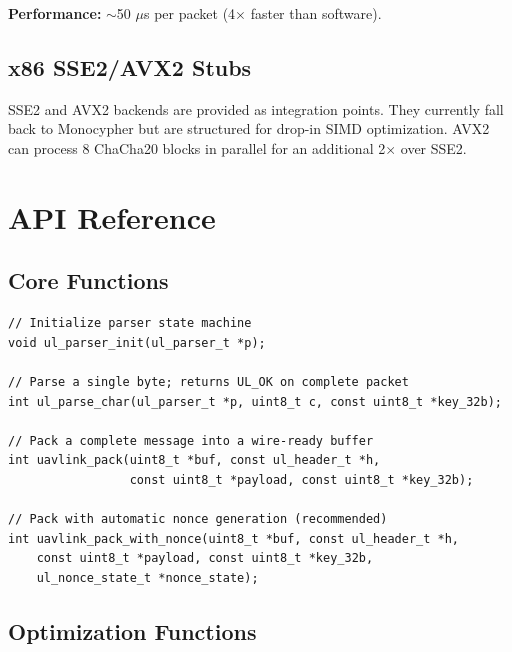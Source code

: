 \documentclass[11pt,a4paper]{article}
\begin{document}
\textbf{Performance:} $\sim$50 $\mu$s per packet (4$\times$ faster than software).

\subsection{x86 SSE2/AVX2 Stubs}

SSE2 and AVX2 backends are provided as integration points. They currently fall back to Monocypher but are structured for drop-in SIMD optimization. AVX2 can process 8 ChaCha20 blocks in parallel for an additional 2$\times$ over SSE2.

\section{API Reference}

\subsection{Core Functions}

\begin{lstlisting}
// Initialize parser state machine
void ul_parser_init(ul_parser_t *p);

// Parse a single byte; returns UL_OK on complete packet
int ul_parse_char(ul_parser_t *p, uint8_t c, const uint8_t *key_32b);

// Pack a complete message into a wire-ready buffer
int uavlink_pack(uint8_t *buf, const ul_header_t *h,
                 const uint8_t *payload, const uint8_t *key_32b);

// Pack with automatic nonce generation (recommended)
int uavlink_pack_with_nonce(uint8_t *buf, const ul_header_t *h,
    const uint8_t *payload, const uint8_t *key_32b,
    ul_nonce_state_t *nonce_state);
\end{lstlisting}

\subsection{Optimization Functions}
\end{document}
